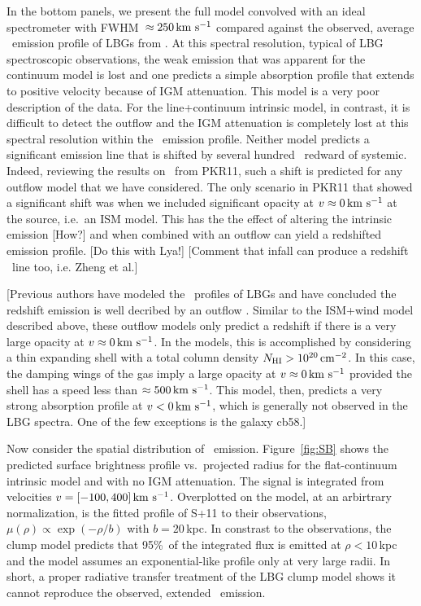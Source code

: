 \documentclass[12pt,preprint]{aastex}
\begin{document}
In the bottom panels, we present the full model convolved with an
ideal spectrometer with FWHM~$\approx 250\, {\rm km~s^{-1}}$ compared against the
observed, average \lya\ emission profile of LBGs from
\cite{shapley03}.  
At this spectral resolution,
typical of LBG spectroscopic observations, the weak emission that was
apparent for the continuum model is lost and one predicts a simple
absorption profile that extends to positive velocity because of IGM
attenuation.  This model is a very poor description of the data.  
For the line+continuum intrinsic model, in contrast, it is difficult
to detect the outflow and the IGM attenuation is completely lost at
this spectral resolution within the \lya\ emission profile.
Neither model predicts a significant emission line that is shifted by
several hundred \kms\ redward of systemic.  Indeed, reviewing the
results on \mgii\ from PKR11, such a shift is predicted for any
outflow model that we have considered.  The only scenario in PKR11
that showed a significant shift was when we included significant
opacity at $v \approx 0 \, {\rm km~s^{-1}}$ at the source, i.e.\ an ISM model.
This has the the effect of altering the intrinsic emission [How?] 
and when combined with an outflow can yield a redshifted emission
profile.  [Do this with Lya!] 
[Comment that infall can produce a redshift \lya\ line too, i.e. Zheng
et al.]

[Previous authors have modeled the \lya\ profiles of LBGs and have
concluded the redshift emission is well decribed by an outflow
\citep[e.g.][]{verhomme}.  Similar to the
ISM+wind model described above, these outflow models only predict a
redshift if there is a very large opacity at $v \approx 0\, {\rm km~s^{-1}}$.  In
the \cite{verhomme} models, this is accomplished by considering a
thin expanding shell with a total  column density $N_{\rm HI} > 10^{20}
\, {\rm cm^{-2}}$.  In this case, the damping wings of the gas imply a large
opacity at $v \approx 0 \, {\rm km~s^{-1}}$ provided the shell has a speed less
than $\approx 500 \, {\rm km~s^{-1}}$.  This model, then, predicts a very strong
absorption profile at $v < 0 \, {\rm km~s^{-1}}$, which is generally not observed
in the LBG spectra.  One of the few exceptions is the galaxy cb58.]

Now consider the spatial distribution of \lya\ emission.
Figure~\ref{fig:SB} shows the predicted surface brightness profile
vs.\ projected radius for the flat-continuum intrinsic model and with
no IGM attenuation.  The signal is integrated from velocities $v =
[-100,400]\, {\rm km~s^{-1}}$. Overplotted on the model, at an arbirtrary
normalization, is the fitted profile of S+11 to their observations,
$\mu(\rho) \propto \exp(-\rho/b)$ with $b=20$\,kpc.  In constrast to
the observations, the clump model predicts that 95\%\ of the
integrated flux is emitted at $\rho < 10$\,kpc and the model assumes
an exponential-like profile only at very large radii.  In short, a
proper radiative transfer treatment of the LBG clump model shows it
cannot reproduce the observed, extended \lya\ emission.  
\end{document}
